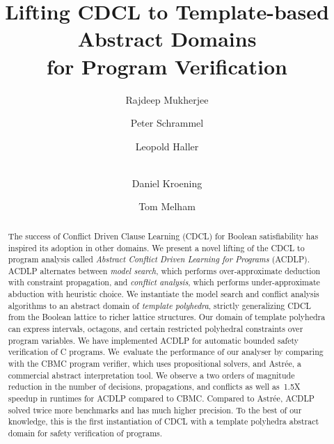 \documentclass[a4paper]{llncs}
\begin{document}
\title{Lifting CDCL to Template-based Abstract Domains\\ for Program Verification}

\author{Rajdeep Mukherjee \and Peter Schrammel \and 
Leopold Haller \and \\ 
Daniel Kroening \and Tom Melham}


\maketitle

\begin{abstract}
%
The success of Conflict Driven Clause Learning (CDCL) for Boolean
satisfiability has inspired its adoption in other domains.  We present a
novel lifting of the CDCL to program analysis called \emph{Abstract Conflict
Driven Learning for Programs} (ACDLP).  ACDLP alternates between \emph{model
search}, which performs over-approximate deduction with constraint
propagation, and \emph{conflict analysis}, which performs under-approximate
abduction with heuristic choice.  We instantiate the model search and
conflict analysis algorithms to an abstract domain of \textit{template
polyhedra}, strictly generalizing CDCL from the Boolean lattice to richer
lattice structures.  Our domain of template polyhedra can express intervals,
octagons, and certain restricted polyhedral constraints over program
variables.  We have implemented ACDLP for automatic bounded safety verification 
of C programs.  We~evaluate the performance of our
analyser by comparing with the CBMC program verifier, which uses
propositional solvers, and Astr{\'e}e, a commercial abstract
interpretation tool.  We observe a two orders of magnitude reduction in the
number of decisions, propagations, and conflicts as well as~1.5X speedup 
in runtimes for ACDLP compared to CBMC.  Compared to Astr{\'e}e, ACDLP solved 
twice more benchmarks and has much higher precision.  To the best of our 
knowledge, this is the first instantiation of CDCL with a template polyhedra 
abstract domain for safety verification of programs.
%
\end{abstract}


\end{document}
